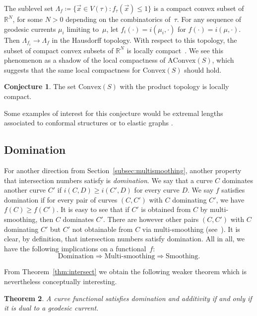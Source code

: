 \documentclass[11pt]{amsart}
\numberwithin{equation}{section}
\numberwithin{figure}{section}
\newtheorem{theorem}{Theorem}[section]
\theoremstyle{definition}
\newtheorem{conjecture}[theorem]{Conjecture}
\theoremstyle{plain}
\newcommand{\AConvex}{\mathrm{AConvex}}
\newcommand{\Convex}{\mathrm{Convex}}
\begin{document}
The sublevel set $\Lambda_f \coloneqq \{ \vec{x} \in V(\tau)
: f_{\tau}(\vec{x}) \leq 1 \}$ is a compact convex subset of
$\mathbb{R}^N$, for some $N>0$ depending on the combinatorics of~$\tau$.
For any sequence of geodesic currents $\mu_i$ limiting to~$\mu$,
let $f_i(\cdot) = i(\mu_i, \cdot)$ for $f(\cdot) = i(\mu, \cdot)$.
Then $\Lambda_{f_i} \to \Lambda_f$ in the Hausdorff topology. With
respect to this topology,
the subset of compact convex subsets of $\mathbb{R}^N$ is locally
compact~\cite[Chapter~6]{Lay92:Convex}. We see this phenomenon as a shadow of the local compactness of $\AConvex(S)$, which suggests that the same local compactness for $\Convex(S)$ should hold.

\begin{conjecture}
The set $\Convex(S)$ with the product topology is locally compact.
\end{conjecture}

Some examples of interest for this conjecture would be extremal
lengths associated to conformal structures or to elastic graphs
\cite[Sections 4.8 and 4.9]{MGT21:Smoothings}.

\subsection{Domination}
\label{subsec:domination}
For another direction from Section~\ref{subsec:multismoothing},
another property that intersection numbers satisfy is \emph{domination}.
We say that a curve $C$ dominates another curve $C'$ if $i(C,D) \geq
i(C',D)$ for every curve $D$. We say $f$ satisfies domination if for
every pair of curves $(C,C')$ with $C$ dominating $C'$, we have
$f(C) \geq f(C')$.
It is easy to see that if $C'$ is obtained from $C$ by
multi-smoothing, then $C$ dominates $C'$. There are however other
pairs $(C,C')$ with $C$ dominating $C'$ but $C'$ not obtainable from
$C$ via multi-smoothing
(see~\cite[Example]{NC01:ShortestGeodesics}).
It is clear, by definition, that intersection numbers satisfy domination.
All in all, we have the following implications on a functional~$f$:
\[
  \text{Domination} \Rightarrow \text{Multi-smoothing} \Rightarrow \text{Smoothing}.
\]

From Theorem~\ref{thm:intersect} we obtain the following weaker
theorem which is nevertheless conceptually interesting.

\begin{theorem}
A curve functional satisfies domination and additivity if and only if it is dual to a geodesic current.
\end{theorem}
\end{document}
